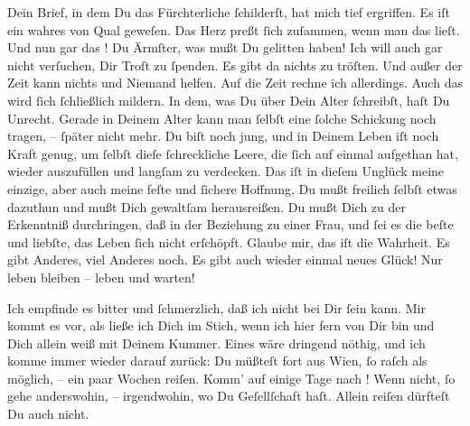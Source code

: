 \pstart
           Dein Brief, in dem Du das Fürchterliche{ }ſchilderſt, hat mich tief ergriffen. Es iſt
               ein wahres \label{K_L02871-3v}\label{K_L02871-3} von
               Qual geweſen. Das Herz preßt{ }ſich zuſammen, wenn man das lieſt. Und nun gar das
                  \label{K_L02871-4v}\label{K_L02871-4}! Du
               Ärmſter, was mußt Du gelitten haben! Ich will auch gar nicht verſuchen, Dir Troſt zu{ }ſpenden. Es gibt  da nichts zu tröſten. Und außer der Zeit kann nichts und Niemand helfen. Auf
               die Zeit rechne ich allerdings. Auch das wird{ }ſich{ }ſchließlich mildern.  In dem, was Du über {\pb}Dein Alter{ }ſchreibſt,
               haſt Du Unrecht. Gerade in Deinem Alter kann man{ }ſelbſt eine{ }ſolche Schickung noch
               tragen, –{ }ſpäter nicht mehr. Du biſt noch jung, und in Deinem Leben iſt noch Kraft
               genug, um{ }ſelbſt dieſe{ }ſchreckliche Leere, die{ }ſich auf einmal aufgethan hat, wieder
               auszufüllen und \strikeout{\textcolor{gray}{zu}\textcolor{gray}{×}} langſam \introOben{}zu\introOben{} verdecken. Das iſt \strikeout{\textcolor{gray}{×}} in dieſem Unglück meine einzige, aber auch meine feſte und{ }ſichere Hoffnung,
               Du mußt freilich{ }ſelbſt etwas dazuthun und mußt Dich gewaltſam herausreißen. Du mußt
               Dich zu der Erkenntniß durchringen, daß in der Beziehung zu einer Frau, und{ }ſei es
               die beſte und liebſte, das Leben{ }ſich nicht erſchöpft. Glaube mir, das iſt die
               Wahrheit. Es gibt Anderes, viel Anderes noch. Es gibt auch wieder einmal neues Glück!
               Nur leben bleiben – leben und warten!\pend
           
\pstart
           Ich empfinde es bitter und{ }ſchmerzlich, daß ich nicht bei Dir{ }ſein kann. Mir kommt es
               vor, als ließe ich Dich im Stich, wenn ich hier fern von Dir bin und Dich allein weiß
               mit Deinem Kummer. Eines wäre 
               dringend nöthig, und ich komme immer wieder darauf zurück: {\pb}Du müßteſt fort aus Wien,{ }ſo raſch als möglich, – ein paar Wochen reiſen. Komm’ auf einige Tage
               nach \label{K_L02871-5v}\label{K_L02871-5}! Wenn nicht,{ }ſo
               gehe anderswohin, – irgendwohin, wo Du Geſellſchaft haſt. Allein reiſen dürfteſt Du
               auch nicht.\pend
           
